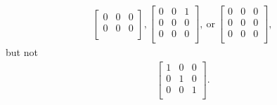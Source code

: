 \documentclass[12pt]{article}
\begin{document}
\begin{enumerate}
\begin{align*}
\begin{bmatrix}
        0 & 0 & 0\\
        0 & 0 & 0\\
      \end{bmatrix},
      \begin{bmatrix}
        0 & 0 & 1\\
        0 & 0 & 0\\
        0 & 0 & 0\\
      \end{bmatrix},\ \text{or}\
      \begin{bmatrix}
        0 & 0 & 0\\
        0 & 0 & 0\\
        0 & 0 & 0\\
      \end{bmatrix},
    \end{align*}
    but not
    \begin{align*}
      \begin{bmatrix}
        1 & 0 & 0\\
        0 & 1 & 0\\
        0 & 0 & 1\\
      \end{bmatrix}.
    \end{align*}

\end{enumerate}
\end{document}
